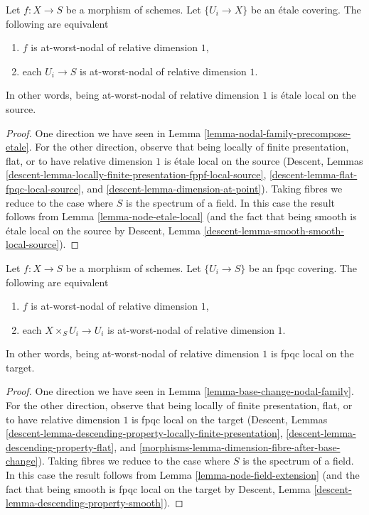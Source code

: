 \begin{lemma}
\label{lemma-nodal-family-etale-local-source}
Let $f : X \to S$ be a morphism of schemes. Let $\{U_i \to X\}$
be an \'etale covering. The following are equivalent
\begin{enumerate}
\item $f$ is at-worst-nodal of relative dimension $1$,
\item each $U_i \to S$ is at-worst-nodal of relative dimension $1$.
\end{enumerate}
In other words, being at-worst-nodal of relative dimension $1$
is \'etale local on the source.
\end{lemma}

\begin{proof}
One direction we have seen in Lemma \ref{lemma-nodal-family-precompose-etale}.
For the other direction, observe that being locally of finite
presentation, flat, or to have relative dimension $1$
is \'etale local on the source
(Descent, Lemmas
\ref{descent-lemma-locally-finite-presentation-fppf-local-source},
\ref{descent-lemma-flat-fpqc-local-source}, and
\ref{descent-lemma-dimension-at-point}). Taking fibres we reduce
to the case where $S$ is the spectrum of a field. In this case the
result follows from Lemma \ref{lemma-node-etale-local}
(and the fact that being smooth is \'etale local on the source by
Descent, Lemma \ref{descent-lemma-smooth-smooth-local-source}).
\end{proof}

\begin{lemma}
\label{lemma-nodal-family-fpqc-local-target}
Let $f : X \to S$ be a morphism of schemes. Let $\{U_i \to S\}$
be an fpqc covering. The following are equivalent
\begin{enumerate}
\item $f$ is at-worst-nodal of relative dimension $1$,
\item each $X \times_S U_i \to U_i$ is at-worst-nodal of relative
dimension $1$.
\end{enumerate}
In other words, being at-worst-nodal of relative dimension $1$
is fpqc local on the target.
\end{lemma}

\begin{proof}
One direction we have seen in Lemma \ref{lemma-base-change-nodal-family}.
For the other direction, observe that being locally of finite
presentation, flat, or to have relative dimension $1$
is fpqc local on the target
(Descent, Lemmas
\ref{descent-lemma-descending-property-locally-finite-presentation},
\ref{descent-lemma-descending-property-flat}, and
\ref{morphisms-lemma-dimension-fibre-after-base-change}).
Taking fibres we reduce
to the case where $S$ is the spectrum of a field. In this case the
result follows from Lemma \ref{lemma-node-field-extension}
(and the fact that being smooth is fpqc local on the target by
Descent, Lemma \ref{descent-lemma-descending-property-smooth}).
\end{proof}

